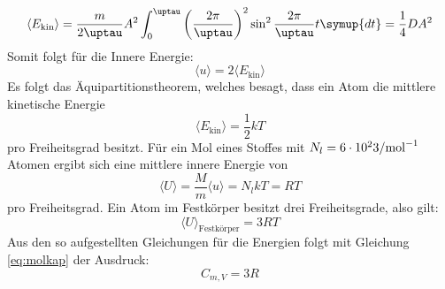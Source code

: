 \begin{equation}
  \langle E_\text{kin} \rangle = \frac{m}{2\uptau} A^2 \int_0^\uptau \left(\frac{2\pi}{\uptau}\right)^2 \sin^2{\frac{2\pi}{\uptau}t} \symup{dt} = \frac{1}{4}DA^2
\end{equation}
Somit folgt für die Innere Energie:
\begin{equation}
  \langle u \rangle = 2 \langle E_\text{kin} \rangle
\end{equation}
Es folgt das Äquipartitionstheorem, welches besagt, dass ein Atom die mittlere kinetische Energie
\begin{equation}
  \langle E_\text{kin} \rangle = \frac{1}{2}kT
\end{equation}
pro Freiheitsgrad besitzt.
Für ein Mol eines Stoffes mit $N_l=6 \cdot 10^23/\si[per-mode=reciprocal]{\per\mol}$\cite{v201} Atomen ergibt sich eine mittlere innere Energie von
\begin{equation}
  \langle U \rangle = \frac{M}{m} \langle u \rangle = N_l k T = R T
\end{equation}
pro Freiheitsgrad.
Ein Atom im Festkörper besitzt drei Freiheitsgrade, also gilt:
\begin{equation}
  \langle U \rangle _\text{Festkörper}= 3 R T
\end{equation}
Aus den so aufgestellten Gleichungen für die Energien folgt mit Gleichung \eqref{eq:molkap} der Ausdruck:
\begin{equation}
\label{eqn:peitsche}
C_{m,V} = 3R
\end{equation}
